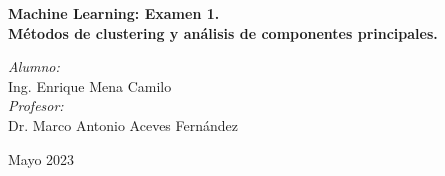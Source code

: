 
\begin{titlepage}

\vspace*{10cm}
{\huge \bfseries \textcolor{RojoUAQ}{Machine Learning: Examen 1.\\ Métodos de clustering y análisis de componentes principales.}}

\vspace*{1cm}

\begin{center}
	\noindent
	\begin{minipage}{0.4\textwidth}
	\begin{flushleft} \large
	\end{flushleft}
	\end{minipage}	
	\begin{minipage}{0.5\textwidth}
	\begin{flushright} \large
	\emph{Alumno:} \\
	Ing. Enrique Mena Camilo \\[1.5cm]
	\emph{Profesor:} \\
	Dr. Marco Antonio Aceves Fernández
	\end{flushright}
	\end{minipage}
	\vfill
	{\large Mayo 2023}
\end{center}
\end{titlepage}
